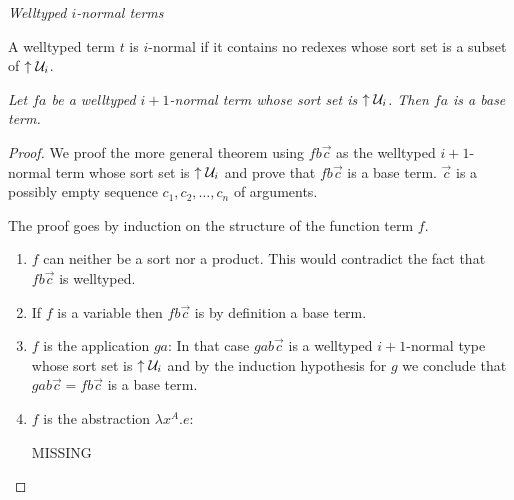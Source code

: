 \begin{definition}
    \label{def:INormalTerm}
    \emph{Welltyped $i$-normal terms}

    A welltyped term $t$ is $i$-normal if it contains no redexes whose sort set
    is a subset of ${\uparrow {\cal U}_i}$.
\end{definition}






\begin{theorem}
    \label{thm:NormalBaseTerm}
    \emph{Let $fa$ be a welltyped $i+1$-normal term whose sort set is ${{\uparrow {\cal U}_{i}}}$.  Then $fa$ is a base term.}

    \begin{proof}
        We proof the more general theorem using $f b \vec c$ as the welltyped
        $i+1$-normal term whose sort set is ${{\uparrow {\cal U}_{i}}}$ and prove that $f b
        \vec c$ is a base term. $\vec c$ is a possibly empty sequence $c_1, c_2,
        \ldots, c_n$ of arguments.

        The proof goes by induction on the structure of the function term $f$.
        \begin{enumerate}

            \item $f$ can neither be a sort nor a product. This would contradict
                the fact that $f b \vec c$ is welltyped.

            \item If $f$ is a variable then $f b \vec c$ is by definition a base
                term.

            \item $f$ is the application $ga$: In that case $gab\vec c$ is a
                welltyped $i+1$-normal type whose sort set is ${{\uparrow {\cal U}_{i}}}$ and
                by the induction hypothesis for $g$ we conclude that $g a b \vec
                c = f b \vec c$ is a base term.

            \item $f$ is the abstraction $\lambda x^A. e$:

                MISSING
        \end{enumerate}
    \end{proof}
\end{theorem}








